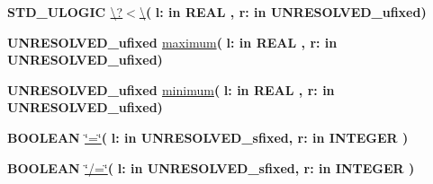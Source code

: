 \begin{DoxyCompactItemize}
\item 
{\bfseries {\bfseries \textcolor{comment}{S\+T\+D\+\_\+\+U\+L\+O\+G\+I\+C}\textcolor{vhdlchar}{ }}} \hyperlink{class__fixed__pkg_a7e98e66a4a282c529968f69f70dd16ad}{\textbackslash{}?$<$\textbackslash{}}{\bfseries  ( }{\bfseries \textcolor{vhdlchar}{l\+: }\textcolor{stringliteral}{in }{\bfseries \textcolor{comment}{R\+E\+A\+L}\textcolor{vhdlchar}{ }}}{\bfseries  , \textcolor{vhdlchar}{r\+: }\textcolor{stringliteral}{in }\textcolor{vhdlchar}{U\+N\+R\+E\+S\+O\+L\+V\+E\+D\+\_\+ufixed}}{\bfseries  )} 
\item 
{\bfseries {\bfseries \textcolor{vhdlchar}{U\+N\+R\+E\+S\+O\+L\+V\+E\+D\+\_\+ufixed}\textcolor{vhdlchar}{ }}} \hyperlink{class__fixed__pkg_a8e1abbe4534fa7d5dea9fee275da3723}{maximum}{\bfseries  ( }{\bfseries \textcolor{vhdlchar}{l\+: }\textcolor{stringliteral}{in }{\bfseries \textcolor{comment}{R\+E\+A\+L}\textcolor{vhdlchar}{ }}}{\bfseries  , \textcolor{vhdlchar}{r\+: }\textcolor{stringliteral}{in }\textcolor{vhdlchar}{U\+N\+R\+E\+S\+O\+L\+V\+E\+D\+\_\+ufixed}}{\bfseries  )} 
\item 
{\bfseries {\bfseries \textcolor{vhdlchar}{U\+N\+R\+E\+S\+O\+L\+V\+E\+D\+\_\+ufixed}\textcolor{vhdlchar}{ }}} \hyperlink{class__fixed__pkg_ae6f8be7af801cf9cb3dcc7b877059955}{minimum}{\bfseries  ( }{\bfseries \textcolor{vhdlchar}{l\+: }\textcolor{stringliteral}{in }{\bfseries \textcolor{comment}{R\+E\+A\+L}\textcolor{vhdlchar}{ }}}{\bfseries  , \textcolor{vhdlchar}{r\+: }\textcolor{stringliteral}{in }\textcolor{vhdlchar}{U\+N\+R\+E\+S\+O\+L\+V\+E\+D\+\_\+ufixed}}{\bfseries  )} 
\item 
{\bfseries {\bfseries \textcolor{comment}{B\+O\+O\+L\+E\+A\+N}\textcolor{vhdlchar}{ }}} \hyperlink{class__fixed__pkg_a7949e9258ea0749e3b35961feea8db87}{\char`\"{}=\char`\"{}}{\bfseries  ( }{\bfseries \textcolor{vhdlchar}{l\+: }\textcolor{stringliteral}{in }\textcolor{vhdlchar}{U\+N\+R\+E\+S\+O\+L\+V\+E\+D\+\_\+sfixed}}{\bfseries  , \textcolor{vhdlchar}{r\+: }\textcolor{stringliteral}{in }{\bfseries \textcolor{comment}{I\+N\+T\+E\+G\+E\+R}\textcolor{vhdlchar}{ }}}{\bfseries  )} 
\item 
{\bfseries {\bfseries \textcolor{comment}{B\+O\+O\+L\+E\+A\+N}\textcolor{vhdlchar}{ }}} \hyperlink{class__fixed__pkg_a00087aded97b434060226b9ba63a9077}{\char`\"{}/=\char`\"{}}{\bfseries  ( }{\bfseries \textcolor{vhdlchar}{l\+: }\textcolor{stringliteral}{in }\textcolor{vhdlchar}{U\+N\+R\+E\+S\+O\+L\+V\+E\+D\+\_\+sfixed}}{\bfseries  , \textcolor{vhdlchar}{r\+: }\textcolor{stringliteral}{in }{\bfseries \textcolor{comment}{I\+N\+T\+E\+G\+E\+R}\textcolor{vhdlchar}{ }}}{\bfseries  )} 

\end{DoxyCompactItemize}
